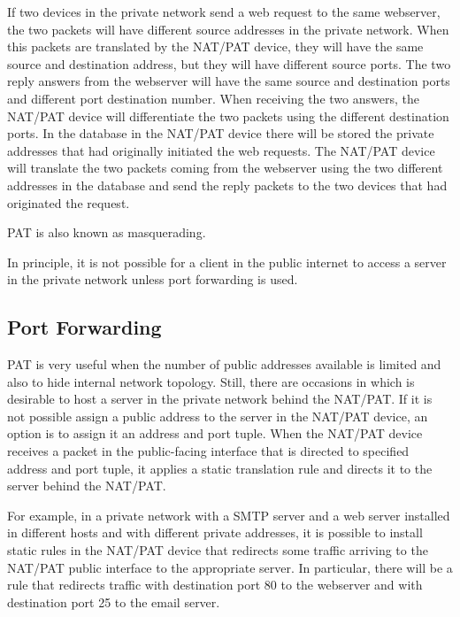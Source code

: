 If two devices in the private network send a web request to the same webserver, the two packets will have different source addresses in the private network.
When this packets are translated by the NAT/PAT device, they will have the same source and destination address, but they will have different source ports.
The two reply answers from the webserver will have the same source and destination ports and different port destination number.
When receiving the two answers, the NAT/PAT device will differentiate the two packets using the different destination ports.
In the database in the NAT/PAT device there will be stored the private addresses that had originally initiated the web requests.
The NAT/PAT device will translate the two packets coming from the webserver using the two different addresses in the database and send the reply packets to the two devices that had originated the request.

PAT is also known as masquerading.

In principle, it is not possible for a client in the public internet to access a server in the private network unless port forwarding is used.

\subsection{Port Forwarding}

PAT is very useful when the number of public addresses available is limited and also to hide internal network topology.
Still, there are occasions in which is desirable to host a server in the private network behind the NAT/PAT.
If it is not possible assign a public address to the server in the NAT/PAT device, an option is to assign it an address and port tuple.
When the NAT/PAT device receives a packet in the public-facing interface that is directed to specified address and port tuple, it applies a static translation rule and directs it to the server behind the NAT/PAT.

For example, in a private network with a SMTP server and a web server installed in different hosts and with different private addresses, it is possible to install static rules in the NAT/PAT device that redirects some traffic arriving to the NAT/PAT public interface to the appropriate server.
In particular, there will be a rule that redirects traffic with destination port 80 to the webserver and with destination port 25 to the email server.

